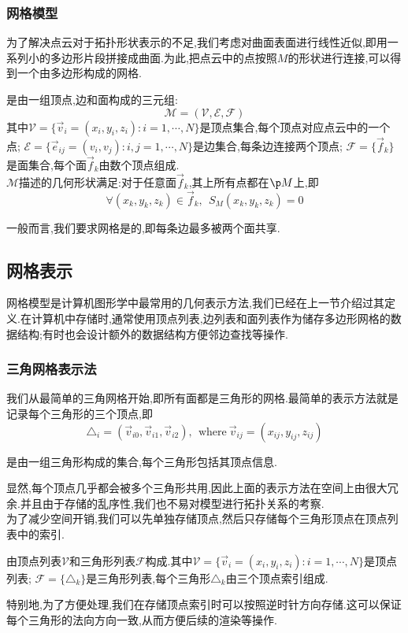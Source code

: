 \documentclass{ctexart}
\begin{document}
\subsubsection{网格模型}
为了解决点云对于拓扑形状表示的不足,我们考虑对曲面表面进行线性近似,即用一系列小的多边形片段拼接成曲面.为此,把点云中的点按照$M$的形状进行连接,可以得到一个由多边形构成的网格.
\begin{definition}[网格模型]
    是由一组顶点,边和面构成的三元组:
    \[\mathcal{M}=(\mathcal{V},\mathcal{E},\mathcal{F})\]
    其中$\mathcal{V}=\{\vec{v}_i=(x_i,y_i,z_i):i=1,\cdots,N\}$是顶点集合,每个顶点对应点云中的一个点; $\mathcal{E}=\{\vec{e}_{ij}=(v_i,v_j):i,j=1,\cdots,N\}$是边集合,每条边连接两个顶点; $\mathcal{F}=\{\vec{f}_k\}$是面集合,每个面$\vec{f}_k$由数个顶点组成.\\
    $\mathcal{M}$描述的几何形状满足:对于任意面$\vec{f}_k$,其上所有点都在$\p M$上,即
    \[\forall\left(x_k,y_k,z_k\right)\in\vec{f}_k,\ \ S_M\left(x_k,y_k,z_k\right)=0\]
\end{definition}
一般而言,我们要求网格是的,即每条边最多被两个面共享.
\subsection{网格表示}
网格模型是计算机图形学中最常用的几何表示方法,我们已经在上一节介绍过其定义.在计算机中存储时,通常使用顶点列表,边列表和面列表作为储存多边形网格的数据结构;有时也会设计额外的数据结构方便邻边查找等操作.
\subsubsection{三角网格表示法}
我们从最简单的三角网格开始,即所有面都是三角形的网格.最简单的表示方法就是记录每个三角形的三个顶点,即\[\triangle_i=\left(\vec{v}_{i0},\vec{v}_{i1},\vec{v}_{i2}\right),\ \ \text{where}\ \vec{v}_{ij}=\left(x_{ij},y_{ij},z_{ij}\right)\]
\begin{definition}[三角形乱序集合]
    是由一组三角形构成的集合,每个三角形包括其顶点信息.
\end{definition}
显然,每个顶点几乎都会被多个三角形共用,因此上面的表示方法在空间上由很大冗余.并且由于存储的乱序性,我们也不易对模型进行拓扑关系的考察.\\
\indent 为了减少空间开销,我们可以先单独存储顶点,然后只存储每个三角形顶点在顶点列表中的索引.
\begin{definition}[索引三角形网格]
    由顶点列表$\mathcal{V}$和三角形列表$\mathcal{F}$构成.其中$\mathcal{V}=\{\vec{v}_i=(x_i,y_i,z_i):i=1,\cdots,N\}$是顶点列表; $\mathcal{F}=\{\triangle_k\}$是三角形列表,每个三角形$\triangle_k$由三个顶点索引组成.
\end{definition}
特别地,为了方便处理,我们在存储顶点索引时可以按照逆时针方向存储.这可以保证每个三角形的法向方向一致,从而方便后续的渲染等操作.
\end{document}

